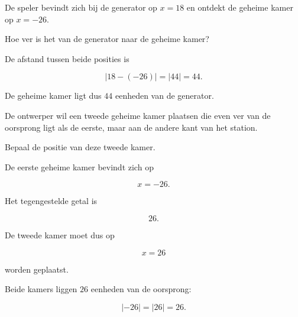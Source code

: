 \documentclass{ximera}
\begin{document}
\begin{oefening}[De metrotunnel]{\oefG\ESS}
\begin{question}
        De speler bevindt zich bij de generator op \(x=18\) en ontdekt de geheime
        kamer op \(x=-26\).
        
        Hoe ver is het van de generator naar de geheime kamer?
        
        \begin{oplossing}
        
        De afstand tussen beide posities is
        
        \[
        |18-(-26)|
        =
        |44|
        =
        44.
        \]
        
        De geheime kamer ligt dus \(44\) eenheden van de generator.
        
        \end{oplossing}
        
        \end{question}
        
        
        \begin{question}
        
        De ontwerper wil een tweede geheime kamer plaatsen die even ver van de
        oorsprong ligt als de eerste, maar aan de andere kant van het station.
        
        Bepaal de positie van deze tweede kamer.
        
        \begin{oplossing}
        
        De eerste geheime kamer bevindt zich op
        
        \[
        x=-26.
        \]
        
        Het tegengestelde getal is
        
        \[
        26.
        \]
        
        De tweede kamer moet dus op
        
        \[
        x=26
        \]
        
        worden geplaatst.
        
        Beide kamers liggen \(26\) eenheden van de oorsprong:
        
        \[
        |-26|=|26|=26.
        \]
        
        \end{oplossing}
        
        \end{question}
        
        
        \begin{question}
        

\end{question}
\end{oefening}
\end{document}
